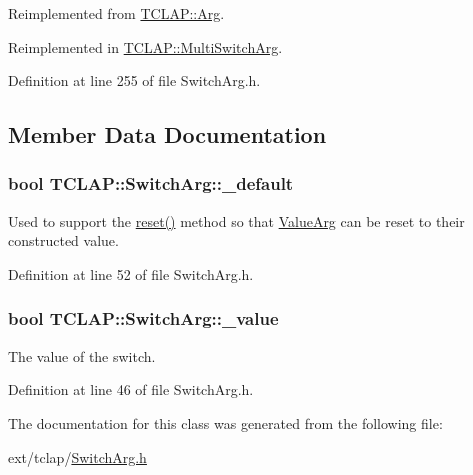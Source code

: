 Reimplemented from \hyperlink{class_t_c_l_a_p_1_1_arg_ab5b5dc9a9b0381561f0684523f943a2c}{T\+C\+L\+A\+P\+::\+Arg}.



Reimplemented in \hyperlink{class_t_c_l_a_p_1_1_multi_switch_arg_ac320530811dbca7fdcb2a41ab252fce4}{T\+C\+L\+A\+P\+::\+Multi\+Switch\+Arg}.



Definition at line 255 of file Switch\+Arg.\+h.



\subsection{Member Data Documentation}
\hypertarget{class_t_c_l_a_p_1_1_switch_arg_ae25a99eb06fc2ee75a3b98edba1d5d8d}{}
\subsubsection[{\+\_\+default}]{\setlength{\rightskip}{0pt plus 5cm}bool T\+C\+L\+A\+P\+::\+Switch\+Arg\+::\+\_\+default\hspace{0.3cm}{\ttfamily [protected]}}\label{class_t_c_l_a_p_1_1_switch_arg_ae25a99eb06fc2ee75a3b98edba1d5d8d}
Used to support the \hyperlink{class_t_c_l_a_p_1_1_switch_arg_af8561d903ec3c11f5f2175e6db179d9c}{reset()} method so that \hyperlink{class_t_c_l_a_p_1_1_value_arg}{Value\+Arg} can be reset to their constructed value. 

Definition at line 52 of file Switch\+Arg.\+h.

\hypertarget{class_t_c_l_a_p_1_1_switch_arg_a0389ecebecc504d9756703d46e8cf3ca}{}
\subsubsection[{\+\_\+value}]{\setlength{\rightskip}{0pt plus 5cm}bool T\+C\+L\+A\+P\+::\+Switch\+Arg\+::\+\_\+value\hspace{0.3cm}{\ttfamily [protected]}}\label{class_t_c_l_a_p_1_1_switch_arg_a0389ecebecc504d9756703d46e8cf3ca}
The value of the switch. 

Definition at line 46 of file Switch\+Arg.\+h.



The documentation for this class was generated from the following file\+:\begin{DoxyCompactItemize}
\item 
ext/tclap/\hyperlink{_switch_arg_8h}{Switch\+Arg.\+h}\end{DoxyCompactItemize}
